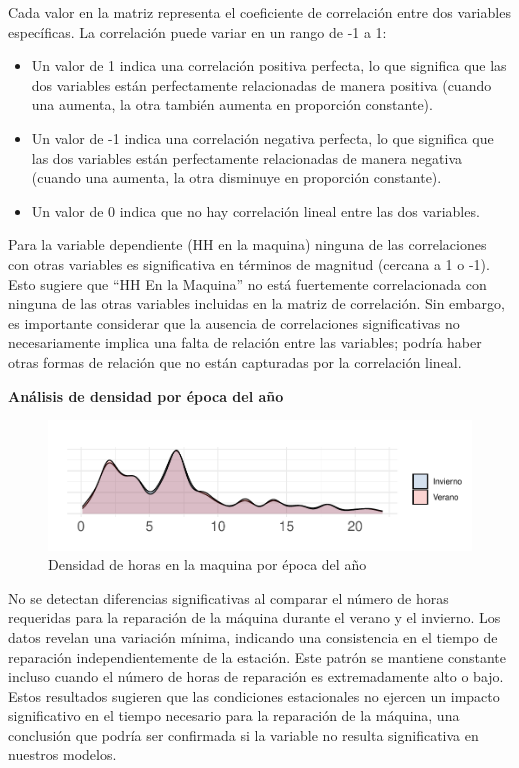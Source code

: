 \documentclass[
  11pt,
  bookmarksnumbered]{article}
\begin{document}
Cada valor en la matriz representa el coeficiente de correlación entre dos variables específicas.
La correlación puede variar en un rango de -1 a 1:

\begin{itemize}
\item
  Un valor de 1 indica una correlación positiva perfecta, lo que significa que las dos variables están perfectamente relacionadas de manera positiva (cuando una aumenta, la otra también aumenta en proporción constante).
\item
  Un valor de -1 indica una correlación negativa perfecta, lo que significa que las dos variables están perfectamente relacionadas de manera negativa (cuando una aumenta, la otra disminuye en proporción constante).
\item
  Un valor de 0 indica que no hay correlación lineal entre las dos variables.
\end{itemize}

Para la variable dependiente (HH en la maquina) ninguna de las correlaciones con otras variables es significativa en términos de magnitud (cercana a 1 o -1).
Esto sugiere que ``HH En la Maquina'' no está fuertemente correlacionada con ninguna de las otras variables incluidas en la matriz de correlación.
Sin embargo, es importante considerar que la ausencia de correlaciones significativas no necesariamente implica una falta de relación entre las variables; podría haber otras formas de relación que no están capturadas por la correlación lineal.

\newpage

\textbf{Análisis de densidad por época del año}

\begin{figure}
\centering
\includegraphics{trabajo_files/figure-latex/unnamed-chunk-16-1.pdf}
\caption{\label{fig:unnamed-chunk-16}Densidad de horas en la maquina por época del año}
\end{figure}

No se detectan diferencias significativas al comparar el número de horas requeridas para la reparación de la máquina durante el verano y el invierno.
Los datos revelan una variación mínima, indicando una consistencia en el tiempo de reparación independientemente de la estación.
Este patrón se mantiene constante incluso cuando el número de horas de reparación es extremadamente alto o bajo.
Estos resultados sugieren que las condiciones estacionales no ejercen un impacto significativo en el tiempo necesario para la reparación de la máquina, una conclusión que podría ser confirmada si la variable no resulta significativa en nuestros modelos.
\end{document}
